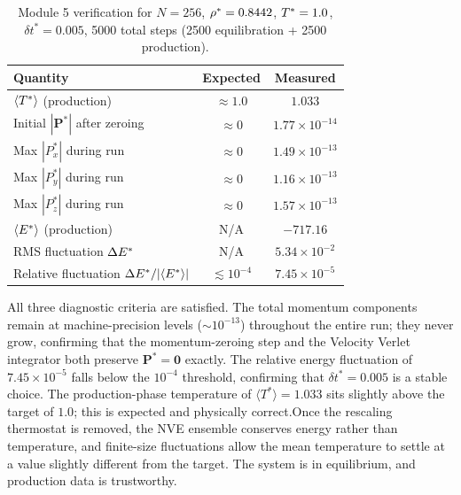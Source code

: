 \begin{table}[H]
    \centering
    \caption{Module 5 verification for $N = 256$, $\rho^{*} = 0.8442$, $T^{*} = 1.0$, $\delta t^* = 0.005$, 5000 total steps (2500 equilibration + 2500 production).}
    \label{tab:m5_test}
    \begin{tabular}{lcc}
        \toprule
        \textbf{Quantity} & \textbf{Expected} & \textbf{Measured} \\
        \midrule
        $\langle T^{*} \rangle$ (production)              & $\approx 1.0$         & $1.033$ \\
        Initial $|\mathbf{P}^*|$ after zeroing             & $\approx 0$           & $1.77 \times 10^{-14}$ \\
        Max $|P_x^*|$ during run                           & $\approx 0$           & $1.49 \times 10^{-13}$ \\
        Max $|P_y^*|$ during run                           & $\approx 0$           & $1.16 \times 10^{-13}$ \\
        Max $|P_z^*|$ during run                           & $\approx 0$           & $1.57 \times 10^{-13}$ \\
        $\langle E^{*} \rangle$ (production)              & N/A                   & $-717.16$ \\
        RMS fluctuation $\Delta E^{*}$                    & N/A                   & $5.34 \times 10^{-2}$ \\
        Relative fluctuation $\Delta E^{*}/|\langle E^{*} \rangle|$ & $\lesssim 10^{-4}$ & $7.45 \times 10^{-5}$ \\
        \bottomrule
    \end{tabular}
\end{table}

All three diagnostic criteria are satisfied. The total momentum components remain at machine-precision levels ($\sim 10^{-13}$) throughout the entire run; they never grow, confirming that the momentum-zeroing step and the Velocity Verlet integrator both preserve $\mathbf{P}^* = \mathbf{0}$ exactly. The relative energy fluctuation of $7.45 \times 10^{-5}$ falls below the $10^{-4}$ threshold, confirming that $\delta t^* = 0.005$ is a stable choice. The production-phase temperature of $\langle T^* \rangle = 1.033$ sits slightly above the target of $1.0$; this is expected and physically correct.Once the rescaling thermostat is removed, the NVE ensemble conserves energy rather than temperature, and finite-size fluctuations allow the mean temperature to settle at a value slightly different from the target. The system is in equilibrium, and production data is trustworthy.